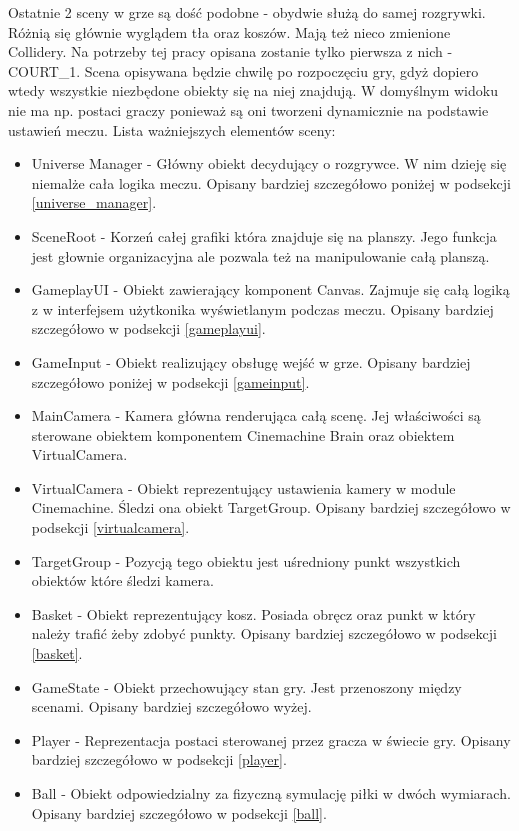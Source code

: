 \documentclass[a4paper,12pt,twoside,openany]{report}
\begin{document}
Ostatnie 2 sceny w grze są dość podobne - obydwie służą do samej rozgrywki. Różnią się głównie wyglądem tła oraz koszów. Mają też nieco zmienione Collidery. Na potrzeby tej pracy opisana zostanie tylko pierwsza z nich - COURT\_1. Scena opisywana będzie chwilę po rozpoczęciu gry, gdyż dopiero wtedy wszystkie niezbędone obiekty się na niej znajdują. W domyślnym widoku nie ma np. postaci graczy ponieważ są oni tworzeni dynamicznie na podstawie ustawień meczu. Lista ważniejszych elementów sceny:
\begin{itemize}
    \item Universe Manager - Główny obiekt decydujący o rozgrywce. W nim dzieję się niemalże cała logika meczu. Opisany bardziej szczegółowo poniżej w podsekcji \ref{universe_manager}.
    \item SceneRoot - Korzeń całej grafiki która znajduje się na planszy. Jego funkcja jest głownie organizacyjna ale pozwala też na manipulowanie całą planszą.
    \item GameplayUI - Obiekt zawierający komponent Canvas. Zajmuje się całą logiką z w interfejsem użytkonika wyświetlanym podczas meczu. Opisany bardziej szczegółowo w podsekcji \ref{gameplayui}.
    \item GameInput - Obiekt realizujący obsługę wejść w grze. Opisany bardziej szczegółowo poniżej w podsekcji \ref{gameinput}.
    \item MainCamera - Kamera główna renderująca całą scenę. Jej właściwości są sterowane obiektem komponentem Cinemachine Brain oraz obiektem VirtualCamera.
    \item VirtualCamera - Obiekt reprezentujący ustawienia kamery w module Cinemachine. Śledzi ona obiekt TargetGroup. Opisany bardziej szczegółowo w podsekcji \ref{virtualcamera}.
    \item TargetGroup - Pozycją tego obiektu jest uśredniony punkt wszystkich obiektów które śledzi kamera.
    \item Basket - Obiekt reprezentujący kosz. Posiada obręcz oraz punkt w który należy trafić żeby zdobyć punkty. Opisany bardziej szczegółowo w podsekcji \ref{basket}.
    \item GameState - Obiekt przechowujący stan gry. Jest przenoszony między scenami. Opisany bardziej szczegółowo wyżej.
    \item Player - Reprezentacja postaci sterowanej przez gracza w świecie gry. Opisany bardziej szczegółowo w podsekcji \ref{player}.
    \item Ball - Obiekt odpowiedzialny za fizyczną symulację piłki w dwóch wymiarach. Opisany bardziej szczegółowo w podsekcji \ref{ball}.

\end{itemize}
\end{document}
